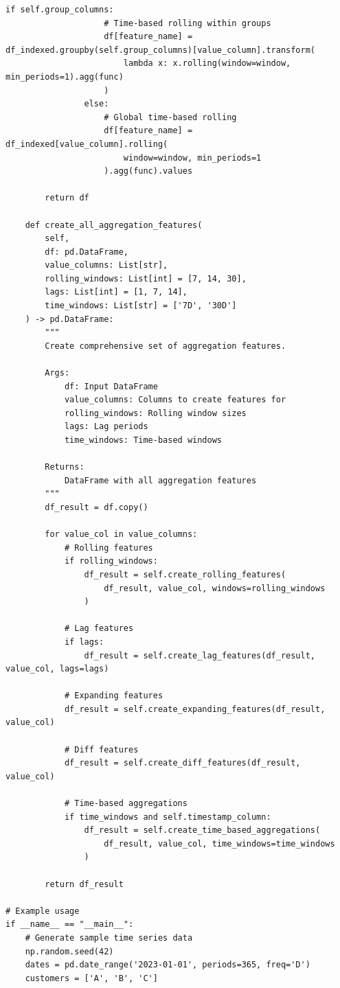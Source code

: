 \begin{lstlisting}[style=python, caption={Scalable Aggregation and Rolling Window Features}]
                if self.group_columns:
                    # Time-based rolling within groups
                    df[feature_name] = df_indexed.groupby(self.group_columns)[value_column].transform(
                        lambda x: x.rolling(window=window, min_periods=1).agg(func)
                    )
                else:
                    # Global time-based rolling
                    df[feature_name] = df_indexed[value_column].rolling(
                        window=window, min_periods=1
                    ).agg(func).values

        return df

    def create_all_aggregation_features(
        self,
        df: pd.DataFrame,
        value_columns: List[str],
        rolling_windows: List[int] = [7, 14, 30],
        lags: List[int] = [1, 7, 14],
        time_windows: List[str] = ['7D', '30D']
    ) -> pd.DataFrame:
        """
        Create comprehensive set of aggregation features.

        Args:
            df: Input DataFrame
            value_columns: Columns to create features for
            rolling_windows: Rolling window sizes
            lags: Lag periods
            time_windows: Time-based windows

        Returns:
            DataFrame with all aggregation features
        """
        df_result = df.copy()

        for value_col in value_columns:
            # Rolling features
            if rolling_windows:
                df_result = self.create_rolling_features(
                    df_result, value_col, windows=rolling_windows
                )

            # Lag features
            if lags:
                df_result = self.create_lag_features(df_result, value_col, lags=lags)

            # Expanding features
            df_result = self.create_expanding_features(df_result, value_col)

            # Diff features
            df_result = self.create_diff_features(df_result, value_col)

            # Time-based aggregations
            if time_windows and self.timestamp_column:
                df_result = self.create_time_based_aggregations(
                    df_result, value_col, time_windows=time_windows
                )

        return df_result

# Example usage
if __name__ == "__main__":
    # Generate sample time series data
    np.random.seed(42)
    dates = pd.date_range('2023-01-01', periods=365, freq='D')
    customers = ['A', 'B', 'C']


\end{lstlisting}

